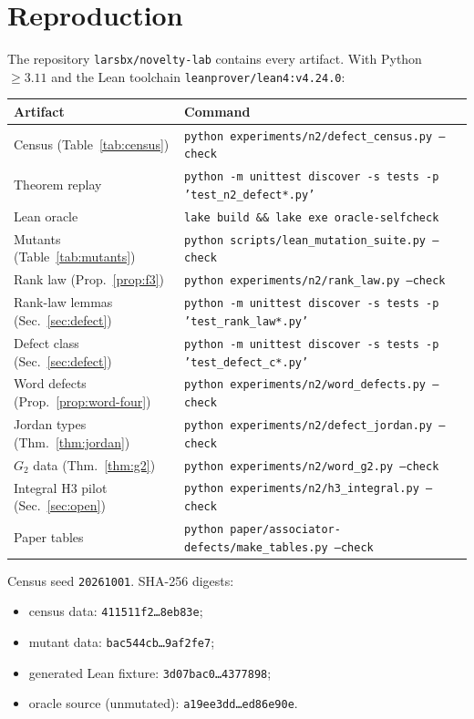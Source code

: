 \documentclass[11pt]{amsart}
\theoremstyle{definition}
\theoremstyle{remark}
\begin{document}
\appendix
\section{Reproduction}\label{app:repro}

The repository \texttt{larsbx/novelty-lab} contains every artifact. With
Python~$\ge3.11$ and the Lean toolchain \texttt{leanprover/lean4:v4.24.0}:
\begin{center}
\small
\begin{tabular}{ll}
\toprule
Artifact & Command \\
\midrule
Census (Table~\ref{tab:census}) & \texttt{python experiments/n2/defect\_census.py --check} \\
Theorem replay & \texttt{python -m unittest discover -s tests -p 'test\_n2\_defect*.py'} \\
Lean oracle & \texttt{lake build \&\& lake exe oracle-selfcheck} \\
Mutants (Table~\ref{tab:mutants}) & \texttt{python scripts/lean\_mutation\_suite.py --check} \\
Rank law (Prop.~\ref{prop:f3}) & \texttt{python experiments/n2/rank\_law.py --check} \\
Rank-law lemmas (Sec.~\ref{sec:defect}) & \texttt{python -m unittest discover -s tests -p 'test\_rank\_law*.py'} \\
Defect class (Sec.~\ref{sec:defect}) & \texttt{python -m unittest discover -s tests -p 'test\_defect\_c*.py'} \\
Word defects (Prop.~\ref{prop:word-four}) & \texttt{python experiments/n2/word\_defects.py --check} \\
Jordan types (Thm.~\ref{thm:jordan}) & \texttt{python experiments/n2/defect\_jordan.py --check} \\
$G_2$ data (Thm.~\ref{thm:g2}) & \texttt{python experiments/n2/word\_g2.py --check} \\
Integral H3 pilot (Sec.~\ref{sec:open}) & \texttt{python experiments/n2/h3\_integral.py --check} \\
Paper tables & \texttt{python paper/associator-defects/make\_tables.py --check} \\
\bottomrule
\end{tabular}
\end{center}
Census seed \texttt{20261001}. SHA-256 digests:
\begin{itemize}
\item census data: \texttt{411511f2\ldots8eb83e};
\item mutant data: \texttt{bac544cb\ldots9af2fe7};
\item generated Lean fixture: \texttt{3d07bac0\ldots4377898};
\item oracle source (unmutated): \texttt{a19ee3dd\ldots ed86e90e}.
\end{itemize}
\end{document}

